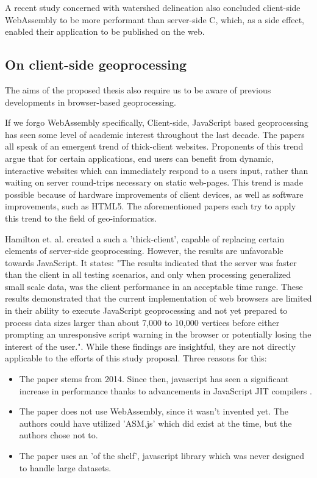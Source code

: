 A recent study concerned with watershed delineation \cite{sit_optimized_2019} also concluded client-side WebAssembly to be more performant than server-side C, which, as a side effect, enabled their application to be published on the web. 


\subsection{On client-side geoprocessing}

The aims of the proposed thesis also require us to be aware of previous developments in browser-based geoprocessing. 

If we forgo WebAssembly specifically, Client-side, JavaScript based geoprocessing has seen some level of academic interest throughout the last decade. The papers \cite{hamilton_client-side_2014, panidi_hybrid_2015, kulawiak_analysis_2019} all speak of an emergent trend of thick-client websites. Proponents of this trend argue that for certain applications, end users can benefit from dynamic, interactive websites which can immediately respond to a users input, rather than waiting on server round-trips necessary on static web-pages. This trend is made possible because of hardware improvements of client devices, as well as software improvements, such as HTML5. The aforementioned papers each try to apply this trend to the field of geo-informatics.

\cite{hamilton_client-side_2014} Hamilton et. al. created a such a 'thick-client', capable of replacing certain elements of server-side geoprocessing. However, the results are unfavorable towards JavaScript. It states: "The results indicated that the server was faster than the client in all testing scenarios, and only when processing generalized small scale data, was the client performance in an acceptable time range. These results demonstrated that the current implementation of web browsers are limited in their ability to execute JavaScript geoprocessing and not yet prepared to process data sizes larger than about 7,000 to 10,000 vertices before either prompting an unresponsive script warning in the browser or potentially losing the interest of the user.". While these findings are insightful, they are not directly applicable to the efforts of this study proposal. Three reasons for this:

\begin{itemize}
  \item The paper stems from 2014. Since then, javascript has seen a significant increase in performance thanks to advancements in JavaScript JIT compilers \cite{kulawiak_analysis_2019}. 
  \item The paper does not use WebAssembly, since it wasn't invented yet. The authors could have utilized 'ASM.js' \cite{mozilla_asmjs_2013} which did exist at the time, but the authors chose not to.  
  \item The paper uses an 'of the shelf', javascript library which was never designed to handle large datasets.
\end{itemize}

